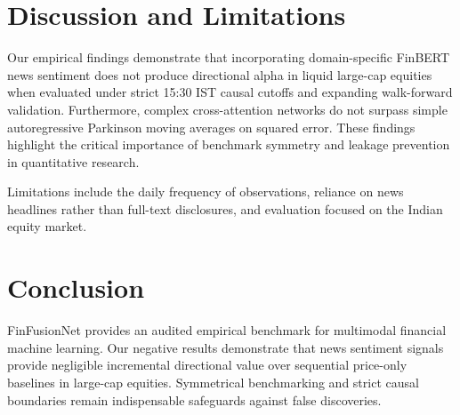 \documentclass[10pt,journal,compsoc,twocolumn]{IEEEtran}
\begin{document}
\section{Discussion and Limitations}
Our empirical findings demonstrate that incorporating domain-specific FinBERT news sentiment does not produce directional alpha in liquid large-cap equities when evaluated under strict 15:30 IST causal cutoffs and expanding walk-forward validation. Furthermore, complex cross-attention networks do not surpass simple autoregressive Parkinson moving averages on squared error. These findings highlight the critical importance of benchmark symmetry and leakage prevention in quantitative research.

Limitations include the daily frequency of observations, reliance on news headlines rather than full-text disclosures, and evaluation focused on the Indian equity market.

\section{Conclusion}
FinFusionNet provides an audited empirical benchmark for multimodal financial machine learning. Our negative results demonstrate that news sentiment signals provide negligible incremental directional value over sequential price-only baselines in large-cap equities. Symmetrical benchmarking and strict causal boundaries remain indispensable safeguards against false discoveries.



\end{document}
